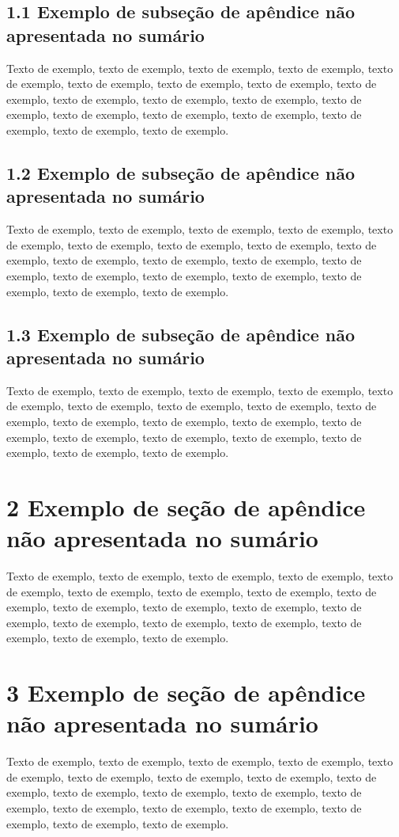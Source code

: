 \documentclass[
	12pt,				%
	oneside,			%
	a4paper,			%
	english,			%
	brazil				%
	]{abntex2ppgsi}
\begin{document}
\begin{apendicesenv}
\subsection*{1.1 Exemplo de subseção de apêndice não apresentada no sumário}

Texto de exemplo, texto de exemplo, texto de exemplo, texto de exemplo, texto de exemplo, texto de exemplo, texto de exemplo, texto de exemplo, texto de exemplo, texto de exemplo, texto de exemplo, texto de exemplo, texto de exemplo, texto de exemplo, texto de exemplo, texto de exemplo, texto de exemplo, texto de exemplo, texto de exemplo.

\subsection*{1.2 Exemplo de subseção de apêndice não apresentada no sumário}

Texto de exemplo, texto de exemplo, texto de exemplo, texto de exemplo, texto de exemplo, texto de exemplo, texto de exemplo, texto de exemplo, texto de exemplo, texto de exemplo, texto de exemplo, texto de exemplo, texto de exemplo, texto de exemplo, texto de exemplo, texto de exemplo, texto de exemplo, texto de exemplo, texto de exemplo.

\subsection*{1.3 Exemplo de subseção de apêndice não apresentada no sumário}

Texto de exemplo, texto de exemplo, texto de exemplo, texto de exemplo, texto de exemplo, texto de exemplo, texto de exemplo, texto de exemplo, texto de exemplo, texto de exemplo, texto de exemplo, texto de exemplo, texto de exemplo, texto de exemplo, texto de exemplo, texto de exemplo, texto de exemplo, texto de exemplo, texto de exemplo.

\section*{2 Exemplo de seção de apêndice não apresentada no sumário}

Texto de exemplo, texto de exemplo, texto de exemplo, texto de exemplo, texto de exemplo, texto de exemplo, texto de exemplo, texto de exemplo, texto de exemplo, texto de exemplo, texto de exemplo, texto de exemplo, texto de exemplo, texto de exemplo, texto de exemplo, texto de exemplo, texto de exemplo, texto de exemplo, texto de exemplo.

\section*{3 Exemplo de seção de apêndice não apresentada no sumário}

Texto de exemplo, texto de exemplo, texto de exemplo, texto de exemplo, texto de exemplo, texto de exemplo, texto de exemplo, texto de exemplo, texto de exemplo, texto de exemplo, texto de exemplo, texto de exemplo, texto de exemplo, texto de exemplo, texto de exemplo, texto de exemplo, texto de exemplo, texto de exemplo, texto de exemplo.

\end{apendicesenv}
\end{document}
